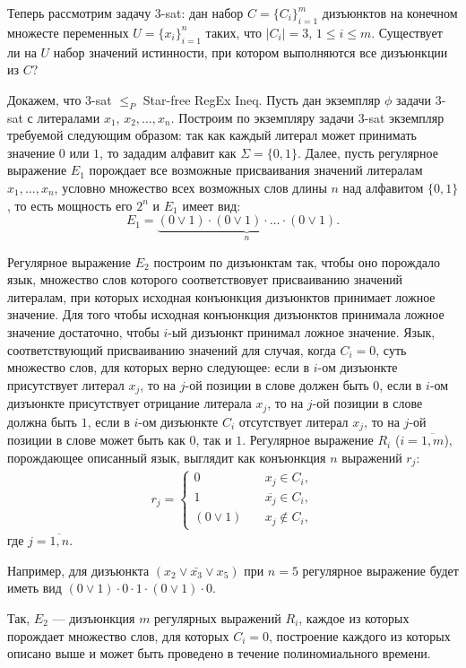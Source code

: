\documentclass[10pt]{article}
\begin{document}
\medskip\par Теперь рассмотрим задачу $3$-sat: дан набор $C=\{C_i\}_{i=1}^m$ дизъюнктов на конечном множесте переменных $U=\{x_i\}_{i=1}^n$ таких, что $|C_i|=3$, $1\leq i\leq m$. Существует ли на $U$ набор значений истинности, при котором выполняются все дизъюнкции из $C$?
\medskip\par Докажем, что 3-sat $\leq_P$ Star-free RegEx Ineq. Пусть дан экземпляр $\phi$ задачи $3$-sat с литералами $x_1$, $x_2, \dots, x_n$. Построим по экземпляру задачи $3$-sat экземпляр требуемой следующим образом: так как каждый литерал может принимать значение $0$ или $1$, то зададим алфавит как $\Sigma=\{0, 1\}$.
Далее, пусть регулярное выражение $E_1$ порождает все возможные присваивания значений литералам $x_1, \ldots, x_n$, условно множество всех возможных слов длины $n$ над алфавитом $\{0, 1\}$, то есть мощность его $2^n$ и $E_1$ имеет вид: $$E_1=\underbrace{(0 \vee 1)\cdot(0 \vee 1)\cdot\ldots\cdot (0 \vee 1)}_n.$$
\par Регулярное выражение $E_2$ построим по дизъюнктам так, чтобы оно порождало язык, множество слов которого соответствовует присваиванию значений литералам, при которых исходная конъюнкция дизъюнктов принимает ложное значение. Для того чтобы исходная конъюнкция дизъюнктов принимала ложное значение достаточно, чтобы $i$-ый дизъюнкт принимал ложное значение. Язык, соответствующий присваиванию значений для случая, когда $C_i=0$, суть множество слов, для которых верно следующее: если в $i$-ом дизъюнкте присутствует литерал $x_j$, то на $j$-ой позиции в слове должен быть $0$,  если в $i$-ом дизъюнкте присутствует отрицание литерала $x_j$, то на $j$-ой позиции в слове должна быть $1$, если в $i$-ом дизъюнкте $C_i$ отсутствует литерал $x_j$, то на $j$-ой позиции в слове может быть как $0$, так и $1$. Регулярное выражение $R_i$ ($i=\overline{1, m}$), порождающее описанный язык, выглядит как конъюнкция $n$ выражений $r_j$: 
\begin{align*}
r_j=\begin{cases}
0\quad& x_j\in C_i,\\
1 \quad& \overline{x_j}\in C_i,\\
(0\vee 1) \quad& x_j\not\in C_i,
\end{cases}
\end{align*}
где $j=\overline{1,n}$.
\medskip\par
Например, для дизъюнкта $(x_2\vee \bar{x_3} \vee x_5)$ при $n=5$ регулярное выражение будет иметь вид $(0\vee 1)\cdot 0 \cdot 1 \cdot (0\vee 1)\cdot 0$. 
\medskip\par Так, $E_2$ --- дизъюнкция $m$ регулярных выражений $R_i$, каждое из которых порождает множество слов, для которых $C_i=0$, построение каждого из которых описано выше и может быть проведено в течение полиномиального времени.
\end{document}
